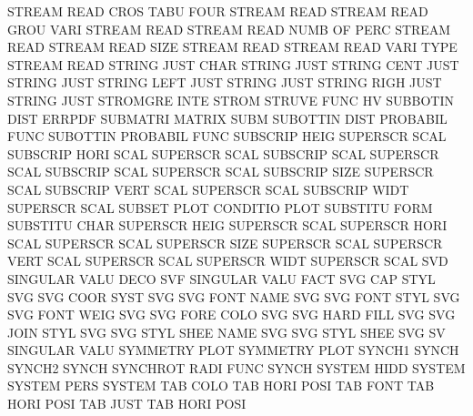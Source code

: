STREAM   READ CROS TABU FOUR            STREAM   READ
STREAM   READ GROU VARI                 STREAM   READ
STREAM   READ NUMB OF   PERC            STREAM   READ
STREAM   READ SIZE                      STREAM   READ
STREAM   READ VARI TYPE                 STREAM   READ
STRING   JUST CHAR                      STRING   JUST
STRING   CENT JUST                      STRING   JUST
STRING   LEFT JUST                      STRING   JUST
STRING   RIGH JUST                      STRING   JUST
STROMGRE INTE                           STROM
STRUVE   FUNC                           HV
SUBBOTIN DIST                           ERRPDF
SUBMATRI                                MATRIX   SUBM
SUBOTTIN DIST                           PROBABIL FUNC
SUBOTTIN                                PROBABIL FUNC
SUBSCRIP HEIG                           SUPERSCR SCAL
SUBSCRIP HORI SCAL                      SUPERSCR SCAL
SUBSCRIP SCAL                           SUPERSCR SCAL
SUBSCRIP SCAL                           SUPERSCR SCAL
SUBSCRIP SIZE                           SUPERSCR SCAL
SUBSCRIP VERT SCAL                      SUPERSCR SCAL
SUBSCRIP WIDT                           SUPERSCR SCAL
SUBSET   PLOT                           CONDITIO PLOT
SUBSTITU FORM                           SUBSTITU CHAR
SUPERSCR HEIG                           SUPERSCR SCAL
SUPERSCR HORI SCAL                      SUPERSCR SCAL
SUPERSCR SIZE                           SUPERSCR SCAL
SUPERSCR VERT SCAL                      SUPERSCR SCAL
SUPERSCR WIDT                           SUPERSCR SCAL
SVD                                     SINGULAR VALU DECO
SVF                                     SINGULAR VALU FACT
SVG      CAP  STYL                      SVG
SVG      COOR SYST                      SVG
SVG      FONT NAME                      SVG
SVG      FONT STYL                      SVG
SVG      FONT WEIG                      SVG
SVG      FORE COLO                      SVG
SVG      HARD FILL                      SVG
SVG      JOIN STYL                      SVG
SVG      STYL SHEE NAME                 SVG
SVG      STYL SHEE                      SVG
SV                                      SINGULAR VALU
SYMMETRY PLOT                           SYMMETRY PLOT
SYNCH1                                  SYNCH
SYNCH2                                  SYNCH
SYNCHROT RADI FUNC                      SYNCH
SYSTEM   HIDD                           SYSTEM
SYSTEM   PERS                           SYSTEM
TAB      COLO                           TAB HORI POSI
TAB      FONT                           TAB HORI POSI
TAB      JUST                           TAB HORI POSI
